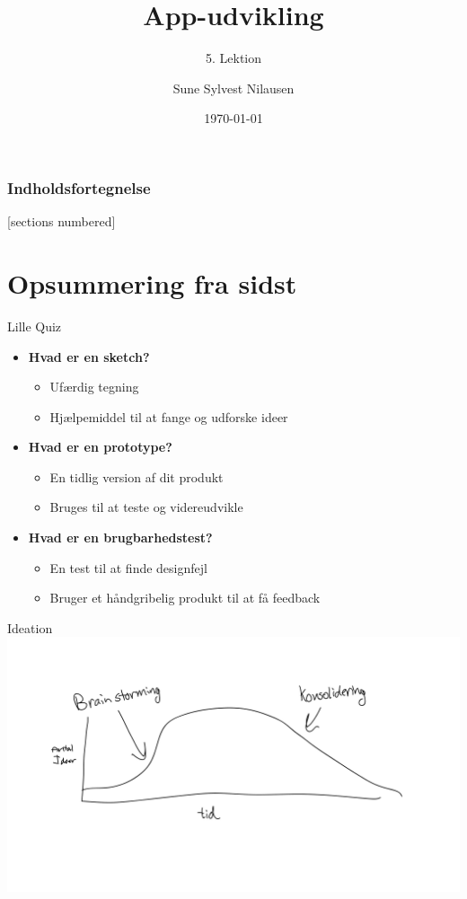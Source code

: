 \documentclass[10pt]{beamer}
\title{App-udvikling}
\subtitle{5. Lektion}
\date{\today}
\author{Sune Sylvest Nilausen}
\begin{document}

\maketitle

\begin{frame}
  \frametitle{Indholdsfortegnelse}
  [sections numbered]
  \tableofcontents[hideallsubsections]
\end{frame}

\section{Opsummering fra sidst}
\begin{frame}{Lille Quiz}
	\begin{itemize}
		\item \textbf{Hvad er en sketch?}
		\pause
		\begin{itemize}
			\item Ufærdig tegning
			\item Hjælpemiddel til at fange og udforske ideer
		\end{itemize}
		\item \textbf{Hvad er en prototype?}
		\pause
			\begin{itemize}
				\item En tidlig version af dit produkt
				\item Bruges til at teste og videreudvikle
			\end{itemize}
		\item \textbf{Hvad er en brugbarhedstest?}
		\pause
			\begin{itemize}
				\item En test til at finde designfejl
				\item Bruger et håndgribelig produkt til at få feedback
			\end{itemize}
	\end{itemize}

\end{frame}

\begin{frame}{Ideation}
		\includegraphics[scale=0.18]{img/ideation.pdf}
\end{frame}
\end{document}
